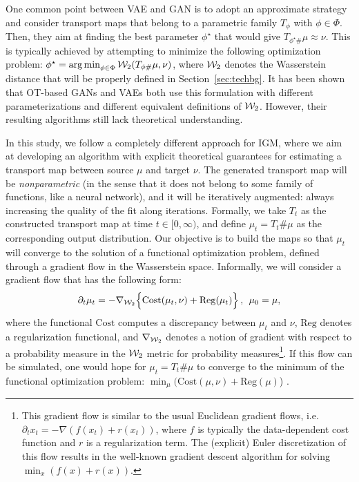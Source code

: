 One common point between VAE and GAN is to adopt an approximate strategy and consider transport maps that belong to a parametric family $T_{\phi}$ with $\phi \in \Phi$. Then, they aim at finding the best parameter $\phi^\star$ that would give $T_{\phi^\star \#}\mu \approx \nu$. This is typically achieved by attempting to minimize the following optimization problem:
$\phi^\star = \operatorname*{arg\min}_{\phi \in \Phi} {\cal W}_2(T_{\phi \#}\mu, \nu)$,
where ${\cal W}_2$ denotes the Wasserstein distance that will be properly defined in Section~\ref{sec:techbg}. It has been shown that \cite{genevay2017gan} OT-based GANs \cite{arjovsky2017wasserstein} and VAEs \cite{tolstikhin2017wasserstein} both use this formulation with different parameterizations and different equivalent definitions of ${\cal W}_2$. However, their resulting algorithms still lack theoretical understanding.


In this study, we follow a completely different approach for IGM, where we aim at developing an algorithm with explicit theoretical guarantees for estimating a transport map between source $\mu$ and target $\nu$. The generated transport map  will be \textit{nonparametric} (in the sense that it does not belong to some family of functions, like a neural network), and it will be iteratively augmented: always increasing the quality of the fit along iterations. Formally, we take $T_t$ as the constructed transport map at time $t \in [0,\infty)$, and define $\mu_t=T_t \# \mu$ as the corresponding output distribution. Our objective is to build the maps so that $\mu_t$ will converge to the solution of a functional optimization problem, defined through a gradient flow in the Wasserstein space. Informally, we will consider a gradient flow that has the following form:
\begin{align}
\partial_t \mu_t = - \nabla_{{\cal W}_2} \Bigl\{ \mathrm{Cost}(\mu_t, \nu) + \mathrm{Reg}(\mu_t)\Bigr\} \, , \>\> \mu_0 = \mu,\label{eqn:gradflow}
\end{align}
where the functional $\mathrm{Cost}$ computes a discrepancy between $\mu_t$ and $\nu$, $\mathrm{Reg}$ denotes a regularization functional, and $\nabla_{{\cal W}_2}$ denotes a notion of gradient with respect to a probability measure in the ${\cal W}_2$ metric for probability measures\footnote{This gradient flow is similar to the usual Euclidean gradient flows, i.e.\ $\partial_t x_t = - \nabla (f(x_t) + r(x_t))$, where $f$ is typically the data-dependent cost function and $r$ is a regularization term. The (explicit) Euler discretization of this flow results in the well-known gradient descent algorithm for solving $\min_x (f(x)+r(x))$.}. If this flow can be simulated, one would hope for $\mu_t=T_t\#\mu$ to converge to the minimum of the functional optimization problem: $\min_\mu ( \mathrm{Cost}(\mu, \nu) + \mathrm{Reg}(\mu)$) \cite{ambrosio2008gradient,santambrogio2017euclidean}.


